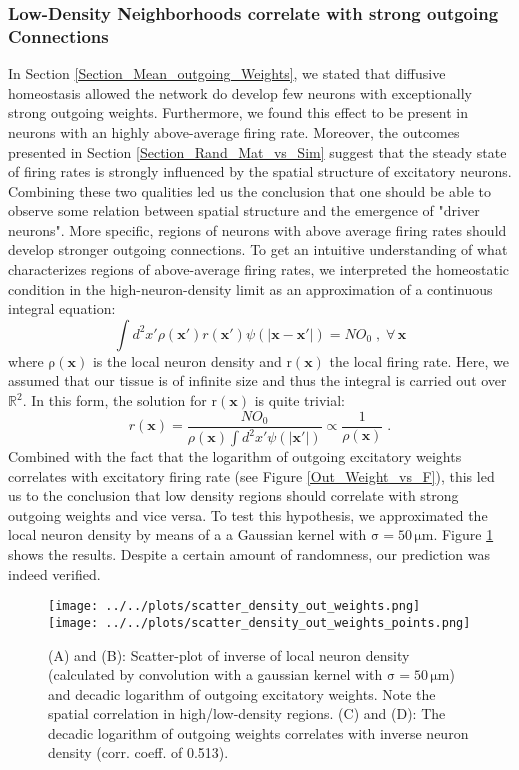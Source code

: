 \documentclass[10pt,a4paper]{article}
\begin{document}
\subsubsection{Low-Density Neighborhoods correlate with strong outgoing Connections}
In Section \ref{Section_Mean_outgoing_Weights}, we stated that diffusive homeostasis allowed the network do develop few neurons with exceptionally strong outgoing weights. Furthermore, we found this effect to be present in neurons with an highly above-average firing rate. Moreover, the outcomes presented in Section \ref{Section_Rand_Mat_vs_Sim} suggest that the steady state of firing rates is strongly influenced by the spatial structure of excitatory neurons. Combining these two qualities led us the conclusion that one should be able to observe some relation between spatial structure and the emergence of "driver neurons". More specific, regions of neurons with above average firing rates should develop stronger outgoing connections. To get an intuitive understanding of what characterizes regions of above-average firing rates, we interpreted the homeostatic condition in the high-neuron-density limit as an approximation of a continuous integral equation:
\begin{equation}
\int d^2 x' \rho(\mathbf{x}') r(\mathbf{x}') \psi(|\mathbf{x}-\mathbf{x}'|) = NO_0 \; , \; \forall \, \mathbf{x}
\label{Density_Limit_Hom}
\end{equation}
where $\mathrm{\rho(\mathbf{x})}$ is the local neuron density and $\mathrm{r(\mathbf{x})}$ the local firing rate. Here, we assumed that our tissue is of infinite size and thus the integral is carried out over $\mathbb{R}^2$. In this form, the solution for $\mathrm{r(\mathbf{x})}$ is quite trivial:
\begin{equation}
r(\mathbf{x}) = \frac{NO_0}{\rho(\mathbf{x}) \int d^2 x' \psi(|\mathbf{x}'|)} \propto \frac{1}{\rho(\mathbf{x})} \; .
\label{Density_Limit_Hom_Solution}
\end{equation}
Combined with the fact that the logarithm of outgoing excitatory weights correlates with excitatory firing rate (see Figure \ref{Out_Weight_vs_F}), this led us to the conclusion that low density regions should correlate with strong outgoing weights and vice versa. To test this hypothesis, we approximated the local neuron density by means of a a Gaussian kernel with $\mathrm{\sigma = 50\, \mu m}$. Figure \ref{Inverse_Dens_vs_Sum_Out_Weights} shows the results. Despite a certain amount of randomness, our prediction was indeed verified. 
\begin{figure}
\texttt{[image: ../../plots/scatter\_density\_out\_weights.png]}
\texttt{[image: ../../plots/scatter\_density\_out\_weights\_points.png]}
\caption{(A) and (B): Scatter-plot of inverse of local neuron density (calculated by convolution with a gaussian kernel with $\mathrm{\sigma = 50\, \mu m}$) and decadic logarithm of outgoing excitatory weights. Note the spatial correlation in high/low-density regions. (C) and (D): The decadic logarithm of outgoing weights correlates with inverse neuron density (corr. coeff. of 0.513).}
\label{Inverse_Dens_vs_Sum_Out_Weights}
\end{figure}
\end{document}
